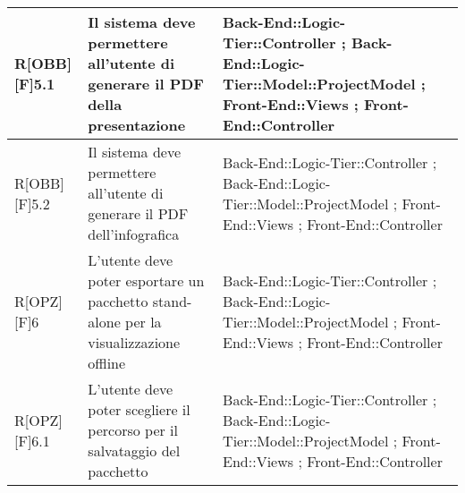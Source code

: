 \begin{table}[h]
\begin{tabular}{|p{}|p{}|p{}|}
			R[OBB][F]5.1 & Il sistema deve permettere all'utente di generare il PDF della presentazione & Back-End::Logic-Tier::Controller ; Back-End::Logic-Tier::Model::ProjectModel ; Front-End::Views ; Front-End::Controller \\ \midrule
			R[OBB][F]5.2 & Il sistema deve permettere all'utente di generare il PDF dell'infografica & Back-End::Logic-Tier::Controller ; Back-End::Logic-Tier::Model::ProjectModel ; Front-End::Views ; Front-End::Controller \\ \midrule
			R[OPZ][F]6 & L'utente deve poter esportare un pacchetto stand-alone per la visualizzazione offline & Back-End::Logic-Tier::Controller ; Back-End::Logic-Tier::Model::ProjectModel ; Front-End::Views ; Front-End::Controller \\ \midrule
			R[OPZ][F]6.1 & L'utente deve poter scegliere il percorso per il salvataggio del pacchetto & Back-End::Logic-Tier::Controller ; Back-End::Logic-Tier::Model::ProjectModel ; Front-End::Views ; Front-End::Controller \\ \midrule

		\end{tabular}
	\end{table}
	\newpage
	
